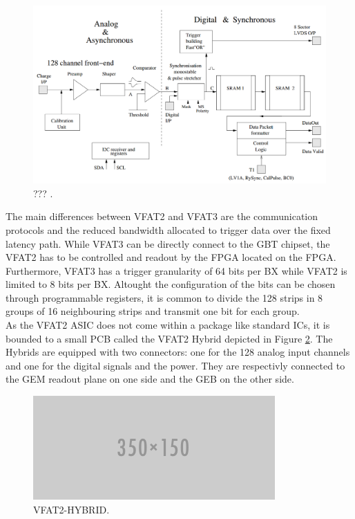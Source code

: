       \begin{figure}[h!]
        \centering
        \includegraphics[width=\textwidth]{img/II-2-daq/vfat2.png}
        \caption{??? \cite{Aspell:1069906}.}
        \label{fig:II-2-daq-vfat2}
      \end{figure}

      The main differences between VFAT2 and VFAT3 are the communication protocols and the reduced bandwidth allocated to trigger data over the fixed latency path. While VFAT3 can be directly connect to the GBT chipset, the VFAT2 has to be controlled and readout by the FPGA located on the FPGA. Furthermore, VFAT3 has a trigger granularity of 64 bits per BX while VFAT2 is limited to 8 bits per BX. Altought the configuration of the bits can be chosen through programmable registers, it is common to divide the 128 strips in 8 groups of 16 neighbouring strips and transmit one bit for each group. \\

      As the VFAT2 ASIC does not come within a package like standard ICs, it is bounded to a small PCB called the VFAT2 Hybrid depicted in Figure \ref{fig:II-2-daq-vfat2-hybrid}. The Hybrids are equipped with two connectors: one for the 128 analog input channels and one for the digital signals and the power. They are respectivly connected to the GEM readout plane on one side and the GEB on the other side.

      \begin{figure}[h!]
        \centering
        \includegraphics[width=\textwidth]{img/empty.png}
        \caption{VFAT2-HYBRID.}
        \label{fig:II-2-daq-vfat2-hybrid}
      \end{figure}

